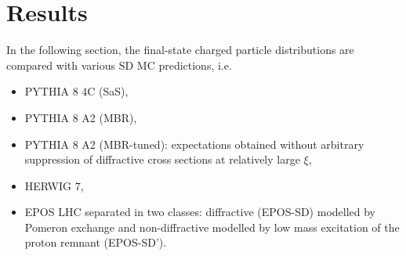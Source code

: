 \section{Results}\label{section:star_results}
In the following section, the  final-state charged particle distributions are compared with various  SD MC predictions, i.e. 
\begin{itemize}
	\item PYTHIA 8 4C (SaS),
	\item PYTHIA 8 A2 (MBR),
	\item PYTHIA 8 A2 (MBR-tuned): expectations obtained without arbitrary suppression of diffractive cross sections at relatively large $\xi$,
	\item HERWIG 7,
	\item EPOS LHC separated in two classes: diffractive (EPOS-SD) modelled by Pomeron exchange and non-diffractive modelled by low mass excitation of the proton remnant (EPOS-SD').
\end{itemize}


